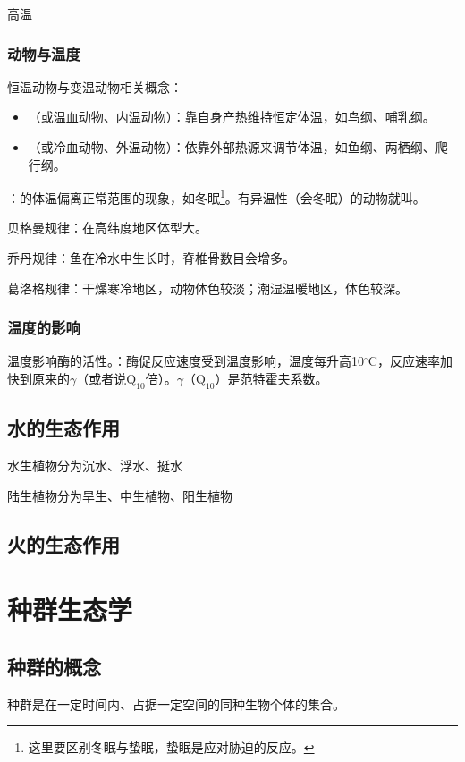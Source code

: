 高温
\subsubsection{动物与温度}

恒温动物与变温动物相关概念：
\begin{itemize}
	\item {}（或温血动物、内温动物）：靠自身产热维持恒定体温，如鸟纲、哺乳纲。
	\item {}（或冷血动物、外温动物）：依靠外部热源来调节体温，如鱼纲、两栖纲、爬行纲。
\end{itemize}

：的体温偏离正常范围的现象，如冬眠\footnote{这里要区别冬眠与蛰眠，蛰眠是应对胁迫的反应。}。有异温性（会冬眠）的动物就叫。

贝格曼规律：在高纬度地区体型大。

乔丹规律：鱼在冷水中生长时，脊椎骨数目会增多。

葛洛格规律：干燥寒冷地区，动物体色较淡；潮湿温暖地区，体色较深。
\subsubsection{温度的影响}
温度影响酶的活性。：酶促反应速度受到温度影响，温度每升高10$^{\circ}\textrm{C}$，反应速率加快到原来的$\gamma$（或者说$\textrm{Q}_{10}$倍）。$\gamma$（$\textrm{Q}_{10}$）是范特霍夫系数。

\subsection{水的生态作用}

水生植物分为沉水、浮水、挺水

陆生植物分为旱生、中生植物、阳生植物

\subsection{火的生态作用}

\section{种群生态学}
\subsection{种群的概念}

种群是在一定时间内、占据一定空间的同种生物个体的集合。

